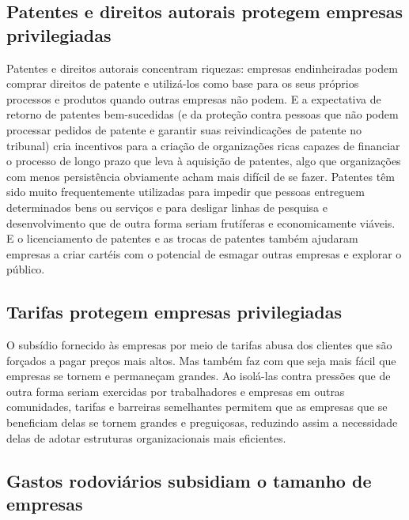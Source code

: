 \subsection*{Patentes e direitos autorais protegem empresas privilegiadas}

Patentes e direitos autorais concentram riquezas: empresas endinheiradas podem comprar direitos de patente e utilizá-los como base para os seus próprios processos e produtos quando outras empresas não podem. E a expectativa de retorno de patentes bem-sucedidas (e da proteção contra pessoas que não podem processar pedidos de patente e garantir suas reivindicações de patente no tribunal) cria incentivos para a criação de organizações ricas capazes de financiar o processo de longo prazo que leva à aquisição de patentes, algo que organizações com menos persistência obviamente acham mais difícil de se fazer. Patentes têm sido muito frequentemente utilizadas para impedir que pessoas entreguem determinados bens ou serviços e para desligar linhas de pesquisa e desenvolvimento que de outra forma seriam frutíferas e economicamente viáveis. E o licenciamento de patentes e as trocas de patentes também ajudaram empresas a criar cartéis com o potencial de esmagar outras empresas e explorar o público.

\subsection*{Tarifas protegem empresas privilegiadas}

O subsídio fornecido às empresas por meio de tarifas abusa dos clientes que são forçados a pagar preços mais altos. Mas também faz com que seja mais fácil que empresas se tornem e permaneçam grandes. Ao isolá-las contra pressões que de outra forma seriam exercidas por trabalhadores e empresas em outras comunidades, tarifas e barreiras semelhantes permitem que as empresas que se beneficiam delas se tornem grandes e preguiçosas, reduzindo assim a necessidade delas de adotar estruturas organizacionais mais eficientes.

\subsection*{Gastos rodoviários subsidiam o tamanho de empresas}

